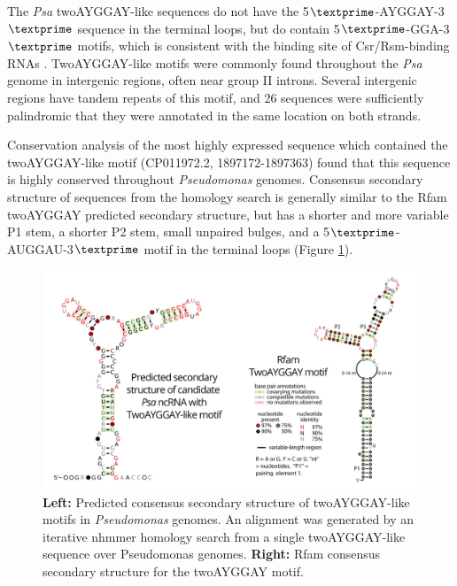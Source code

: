 The \textit{Psa} twoAYGGAY-like sequences do not have the 5$\textprime$-AYGGAY-3$\textprime$ sequence in the terminal loops, but do contain 5$\textprime$-GGA-3$\textprime$ motifs, which is consistent with the binding site of Csr/Rsm-binding RNAs \citep{Gardner2015-co}. TwoAYGGAY-like motifs were commonly found throughout the \textit{Psa} genome in intergenic regions, often near group II introns. Several intergenic regions have tandem repeats of this motif, and 26 sequences were sufficiently palindromic that they were annotated in the same location on both strands.  

Conservation analysis of the most highly expressed sequence which contained the twoAYGGAY-like motif (CP011972.2, 1897172-1897363) found that this sequence is highly conserved throughout \textit{Pseudomonas} genomes. Consensus secondary structure of sequences from the homology search is generally similar to the Rfam twoAYGGAY predicted secondary structure, but has a shorter and more variable P1 stem, a shorter P2 stem, small unpaired bulges, and a 5$\textprime$-AUGGAU-3$\textprime$
motif in the terminal loops (Figure \ref{fig:twoAYGGAY_conserved}). 

\begin{figure}[H]
    \centering
    \includegraphics[scale=0.4]{psa/psa_ncRNA/TwoAYYGAY_example.png}
    \caption[Comparison of predicted consensus secondary structure of twoAYGGAY-like motifs and the Rfam twoAYGGAY motif]{\textbf{Left:} Predicted consensus secondary structure of twoAYGGAY-like motifs in \textit{Pseudomonas} genomes. An alignment was generated by an iterative nhmmer homology search from a single twoAYGGAY-like sequence over Pseudomonas genomes. \textbf{Right:} Rfam consensus secondary structure for the twoAYGGAY motif.}
    \label{fig:twoAYGGAY_conserved}
\end{figure}

